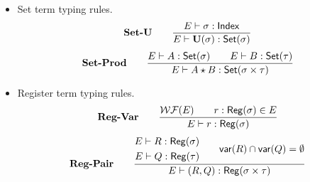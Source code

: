 \begin{itemize}
    \item Set term typing rules.
    \[
        \textbf{Set-U} \qquad
        \frac{E \vdash \sigma : \mathsf{Index}}{E \vdash \mathbf{U}(\sigma) : \mathsf{Set}(\sigma)}
    \]
    \[
        \textbf{Set-Prod} \qquad
        \frac{E \vdash A : \mathsf{Set}(\sigma) \qquad E \vdash B : \mathsf{Set}(\tau)}{E \vdash A \star B : \mathsf{Set}(\sigma \times \tau)}
    \]


    \item Register term typing rules.
    \[
        \textbf{Reg-Var} \qquad
        \frac{\mathcal{WF}(E) \qquad r : \mathsf{Reg}(\sigma) \in E}{E \vdash r : \mathsf{Reg}(\sigma)}
    \]
    \[
        \textbf{Reg-Pair}\qquad
        \frac{
            \begin{aligned}
                E \vdash R : \mathsf{Reg}(\sigma) \\
                E \vdash Q : \mathsf{Reg}(\tau)
            \end{aligned}
            \qquad \mathsf{var}(R) \cap \mathsf{var}(Q) = \emptyset
        }{E \vdash (R,Q) : \mathsf{Reg}(\sigma \times \tau)}
    \]


\end{itemize}
